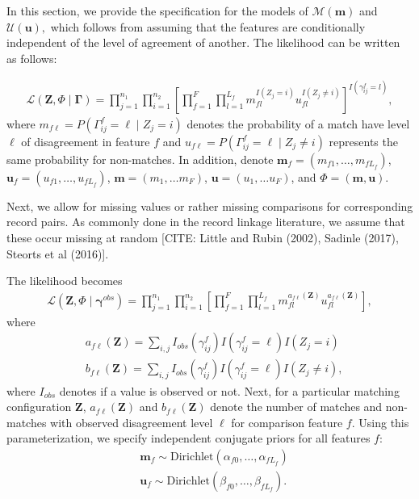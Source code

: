 \documentclass[12pt,letterpaper]{article}
\newcommand{\1}[1]{\mathbb{I}\!\left[#1\right]} %
\begin{document}
In this section, we provide the specification for the models of $\mathcal{M}(\bm{m})$ and $\mathcal{U}(\bm{u}),$ which follows from assuming that the features are conditionally independent of the level of agreement of another. The likelihood can be written as follows:

\begin{align}
\mathcal{L}(\bm{Z}, \Phi \mid \bm{\Gamma}) = \prod_{j=1}^{n_1}  \prod_{i=1}^{n_2}\left[ \prod_{f=1}^{F}\prod_{l=1}^{L_f} m_{fl}^{I(Z_j = i)}u_{fl}^{I(Z_j \neq i)}\right]^{I(\gamma_{ij}^f = l)}, 
\end{align}
where $m_{f\ell} = P(\Gamma_{ij}^f = \ell \mid Z_j = i)$ denotes the probability of a match have level $\ell$ of disagreement in feature $f$ and 
$u_{f\ell} = P(\Gamma_{ij}^f = \ell \mid Z_j \neq i)$ represents the same probability for non-matches. 
In addition, denote $\bm{m}_f = (m_{f1}, \ldots, m_{fL_f})$, $\bm{u}_f = (u_{f1}, \ldots, u_{fL_f})$, 
$\bm{m}= (m_1, \ldots m_F)$, $\bm{u}= (u_1, \ldots u_F)$, and $\Phi = (\bm{m}, \bm{u})$.

Next, we allow for missing values or rather missing comparisons for corresponding record pairs. As commonly done in the record linkage literature, we assume that these occur missing at random [CITE: Little and Rubin (2002), Sadinle (2017), Steorts et al (2016)]. 

The likelihood becomes 
\begin{align}
\mathcal{L}(\bm{Z}, \Phi \mid \bm{\gamma}^{obs}) = 
\prod_{j=1}^{n_1}  \prod_{i=1}^{n_2}\left[ \prod_{f=1}^{F}\prod_{l=1}^{L_f} m_{fl}^{a_{f\ell}(\bm{Z})}u_{fl}^{a_{f\ell}(\bm{Z})}\right], 
\end{align}
where 
\begin{align}
&a_{f\ell}(\bm{Z}) = \sum_{i,j} I_{obs}(\gamma_{ij}^f)I(\gamma_{ij}^f = \ell) I(Z_j = i) \\
&b_{f\ell}(\bm{Z}) = \sum_{i,j} I_{obs}(\gamma_{ij}^f) I(\gamma_{ij}^f = \ell) I(Z_j \neq i),
\end{align}
where $I_{obs}$ denotes if a value is observed or not. Next, for a particular matching configuration $\bm{Z}$, $a_{f\ell}(\bm{Z})$
and $b_{f\ell}(\bm{Z})$ denote the number of matches and non-matches with observed disagreement level $\ell$ for comparison feature $f.$ Using this parameterization, we specify independent conjugate priors for all features $f$:
\begin{align}
&\bm{m}_f \sim \text{Dirichlet}(\alpha_{f0}, \ldots, \alpha_{f L_f}) \\
&\bm{u}_f \sim \text{Dirichlet}(\beta_{f0}, \ldots, \beta_{f L_f}).
\end{align}
\end{document}
